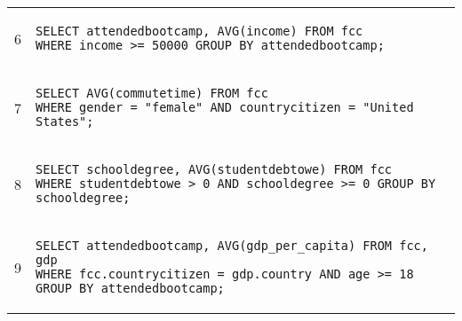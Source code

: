 \begin{tabular}{cl}
\midrule
6 & 
\begin{minipage}{6in}
\begin{lstlisting}[breaklines]
SELECT attendedbootcamp, AVG(income) FROM fcc
WHERE income >= 50000 GROUP BY attendedbootcamp;
\end{lstlisting}
\end{minipage}{queryno} \label[query]{q6} \\
7 & 
\begin{minipage}{6in}
\begin{lstlisting}[breaklines]
SELECT AVG(commutetime) FROM fcc
WHERE gender = "female" AND countrycitizen = "United States";
\end{lstlisting}
\end{minipage}{queryno} \label[query]{q7} \\
8 & 
\begin{minipage}{6in}
\begin{lstlisting}[breaklines]
SELECT schooldegree, AVG(studentdebtowe) FROM fcc
WHERE studentdebtowe > 0 AND schooldegree >= 0 GROUP BY schooldegree;
\end{lstlisting}
\end{minipage}{queryno} \label[query]{q8}\\
9 & 
\begin{minipage}{6in}
\begin{lstlisting}[breaklines]
SELECT attendedbootcamp, AVG(gdp_per_capita) FROM fcc, gdp
WHERE fcc.countrycitizen = gdp.country AND age >= 18
GROUP BY attendedbootcamp;
\end{lstlisting}
\end{minipage}{queryno} \label[query]{q9}\\
\bottomrule
\end{tabular}


